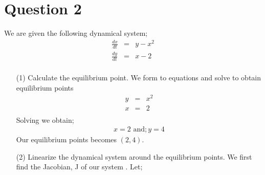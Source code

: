 \documentclass[12pt,a4paper]{article}
\begin{document}
\section*{Question 2}
We are given the following dynamical system;
\begin{eqnarray*}
\frac{dx}{dt}&=&y-x^2\\
\frac{dy}{dt}&=&x-2\\
\end{eqnarray*}
\begin{enumerate}
\item[(1)]
Calculate the equilibrium point. We form to equations and solve to obtain equilibrium points
\begin{eqnarray*}
y&=&x^2\\
x&=&2\\
\end{eqnarray*}
Solving we obtain;
\begin{eqnarray*}\
x=2 \,\, \text{and};y=4\
\end{eqnarray*}
Our equilibrium points becomes $(2,4)$.
\item[(2)]
Linearize the dynamical system around the equilibrium points. We first find the Jacobian, J of our system . Let;


\end{enumerate}
\end{document}
